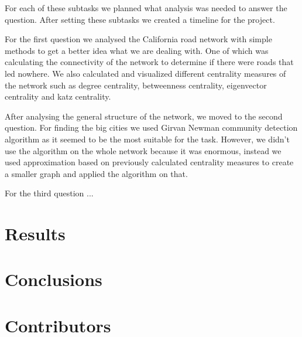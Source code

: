 \documentclass[11pt]{article}
\begin{document}
For each of these subtasks we planned what analysis was needed to answer the question. After setting these subtasks we created a timeline for the project. 

For the first question we analysed the California road network with simple methods to get a better idea what we are dealing with. One of which was calculating the connectivity of the network to determine if there were roads that led nowhere. We also calculated and visualized different centrality measures of the network such as degree centrality, betweenness centrality, eigenvector centrality and katz centrality. 

After analysing the general structure of the network, we moved to the second question. For finding the big cities we used Girvan Newman community detection algorithm as it seemed to be the most suitable for the task. However, we didn't use the algorithm on the whole network because it was enormous, instead we used approximation based on previously calculated centrality measures to create a smaller graph and applied the algorithm on that.

For the third question ...



\section{Results}





\section{Conclusions}










\section{Contributors}
\end{document}
